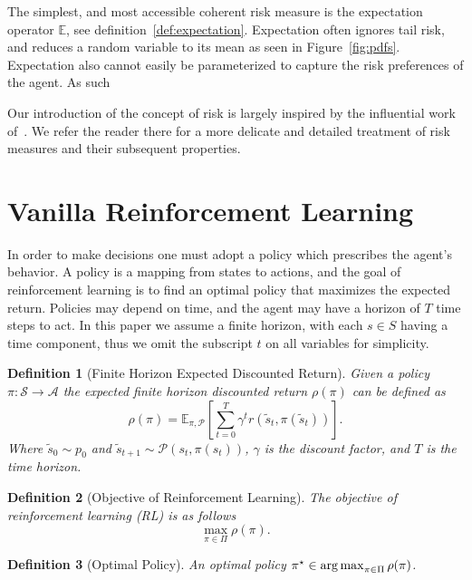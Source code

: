 \documentclass[10pt]{article}
\newtheorem{definition}{Definition}
\renewcommand{\cite}{\citep}
\theoremstyle{plain}
\theoremstyle{remark}
\begin{document}
The simplest, and most accessible coherent risk measure is the expectation operator $\mathbb{E}$, see definition~\ref{def:expectation}.\label{sec:explanation-of-why-risk-measures-are-important}
Expectation often ignores tail risk, and reduces a random variable to its mean as seen in Figure~\ref{fig:pdfs}.
Expectation also cannot easily be parameterized to capture the risk preferences of the agent.
As such


Our introduction of the concept of risk is largely inspired by the influential work of~\cite{follmer2016}. We refer the reader there for a more delicate and detailed treatment of risk measures and their subsequent properties.

\section{Vanilla Reinforcement Learning}\label{sec:vanilla-reinforcement-learning}

In order to make decisions one must adopt a policy which prescribes the agent's behavior.
A policy is a mapping from states to actions, and the goal of reinforcement learning is to find an optimal policy that maximizes the expected return.
Policies may depend on time, and the agent may have a horizon of $T$ time steps to act. 
In this paper we assume a finite horizon, with each $s \in S$ having a time component, thus we omit the subscript $t$ on all variables for simplicity.

\begin{definition}[Finite Horizon Expected Discounted Return]
        Given a policy $\pi : \mathcal{S} \to \mathcal{A}$ the expected finite horizon discounted return $\rho(\pi)$ can be defined as
        \[ 
          \rho(\pi) = \mathbb{E}_{\pi, \mathcal{P}} \left[ \sum_{t=0}^{T} \gamma^t r(\tilde{s}_t, \pi(\tilde{s}_t)) \right].
        \]
        Where $\tilde{s}_0 \sim p_0$ and $\tilde{s}_{t+1} \sim \mathcal{P}(s_t, \pi(s_t))$, $\gamma$ is the discount factor, and $T$ is the time horizon.
\end{definition}

\begin{definition}[Objective of Reinforcement Learning]\label{def:rl_obj}
        The objective of reinforcement learning (RL) is as follows
        \[
        \max_{\pi \in \Pi} \rho(\pi). 
        \]
\end{definition}

\begin{definition}[Optimal Policy]\label{def:optimal_policy}
        An optimal policy $\pi^\star \in \operatorname*{arg\,max}_{\pi \in \Pi} \rho(\pi)$.
\end{definition}
\end{document}
